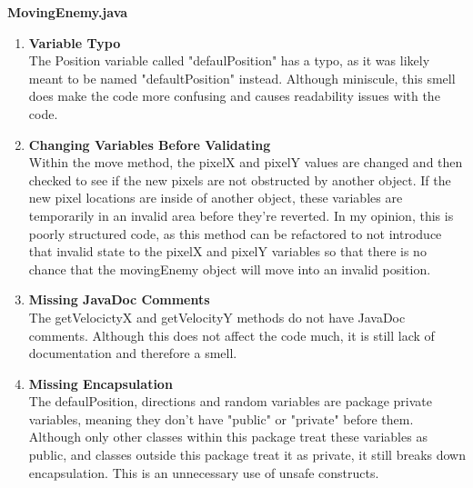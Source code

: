 \documentclass[12pt, letterpaper]{article}
\begin{document}
\textbf{MovingEnemy.java}
\begin{enumerate}
    \item \textbf{Variable Typo} \\
    The Position variable called "defaulPosition" has a typo, as it was likely meant to be named "defaultPosition" instead. Although miniscule, this smell does make the code more confusing and causes readability issues with the code.

    \item \textbf{Changing Variables Before Validating} \\
    Within the move method, the pixelX and pixelY values are changed and then checked to see if the new pixels are not obstructed by another object. If the new pixel locations are inside of another object, these variables are temporarily in an invalid area before they're reverted. In my opinion, this is poorly structured code, as this method can be refactored to not introduce that invalid state to the pixelX and pixelY variables so that there is no chance that the movingEnemy object will move into an invalid position.
    
    \item \textbf{Missing JavaDoc Comments} \\
    The getVelocictyX and getVelocityY methods do not have JavaDoc comments. Although this does not affect the code much, it is still lack of documentation and therefore a smell.

    \item \textbf{Missing Encapsulation} \\
    The defaulPosition, directions and random variables are package private variables, meaning they don't have "public" or "private" before them. Although only other classes within this package treat these variables as public, and classes outside this package treat it as private, it still breaks down encapsulation. This is an unnecessary use of unsafe constructs. \\
\end{enumerate}
\end{document}
